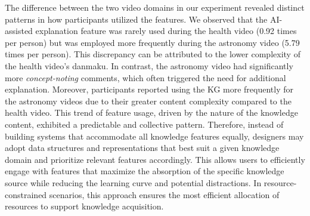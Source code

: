 The difference between the two video domains in our experiment revealed distinct patterns in how participants utilized the features.
We observed that the AI-assisted explanation feature was rarely used during the health video (0.92 times per person) but was employed more frequently during the astronomy video (5.79 times per person).
This discrepancy can be attributed to the lower complexity of the health video’s danmaku. In contrast, the astronomy video had significantly more \textit{concept-noting} comments, which often triggered the need for additional explanation. Moreover, participants reported using the KG more frequently for the astronomy videos due to their greater content complexity compared to the health video. This trend of feature usage, driven by the nature of the knowledge content, exhibited a predictable and collective pattern. Therefore, instead of building systems that accommodate all knowledge features equally, designers may adopt data structures and representations that best suit a given knowledge domain and prioritize relevant features accordingly. This allows users to efficiently engage with features that maximize the absorption of the specific knowledge source while reducing the learning curve and potential distractions. In resource-constrained scenarios, this approach ensures the most efficient allocation of resources to support knowledge acquisition.


